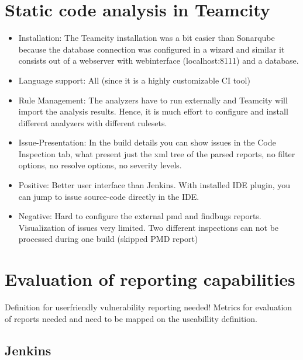 \documentclass[conference]{IEEEtran}
\begin{document}


\section{Static code analysis in Teamcity}
\label{sec:static_code_analysis_teamcity}
\begin{itemize}
\item Installation: The Teamcity installation was a bit easier than Sonarqube because the database connection was configured in a wizard and similar it consists out of a webserver with webinterface (localhost:8111) and a database.

\item Language support: All (since it is a highly customizable CI tool)

\item Rule Management: The analyzers have to run externally and Teamcity will import the analysis results.
Hence, it is much effort to configure and install different analyzers with different rulesets.

\item Issue-Presentation: In the build details you can show issues in the Code Inspection tab, what present just the xml tree of the parsed reports, no filter options, no resolve options, no severity levels.

\item Positive: Better user interface than Jenkins. With installed IDE plugin, you can jump to issue source-code directly in the IDE. 

\item Negative: Hard to configure the external pmd and findbugs reports. Visualization of issues very limited. Two different inspections can not be processed during one build (skipped PMD report)
 
\end{itemize}


\section{Evaluation of reporting capabilities}
\label{sec:evaluation}
Definition for userfriendly vulnerability reporting needed!
Metrics for evaluation of reports needed and need to be mapped on the useabillity definition. 

\subsection{Jenkins}
\label{sec:evaluation_jenkins}
\end{document}
